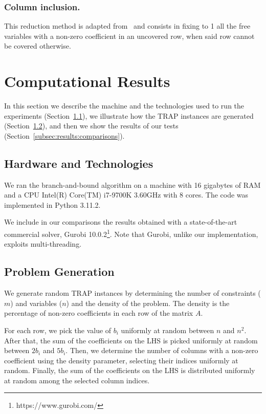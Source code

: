 \documentclass[runningheads]{llncs}
\begin{document}
\subsubsection{Column inclusion.} This reduction method is adapted from~\cite{beasley-1987-algorithm} and consists in fixing to 1 all the free variables with a non-zero coefficient in an uncovered row, when said row cannot be covered otherwise.

\section{Computational Results}
\label{sec:results}

In this section we describe the machine and the technologies used to run the experiments (Section~\ref{subsec:results:tech}), we illustrate how the TRAP instances are generated (Section~\ref{subsec:results:generation}), and then we show the results of our tests (Section~\ref{subsec:results:comparisons}).  

\subsection{Hardware and Technologies}
\label{subsec:results:tech}

We ran the branch-and-bound algorithm on a machine with 16 gigabytes of RAM and a CPU Intel(R) Core(TM) i7-9700K 3.60GHz with 8 cores. The code was implemented in Python 3.11.2.

We include in our comparisons the results obtained with a state-of-the-art commercial solver, Gurobi 10.0.2\footnote{https://www.gurobi.com/}. Note that Gurobi, unlike our implementation, exploits multi-threading. 


\subsection{Problem Generation}
\label{subsec:results:generation}

We generate random TRAP instances by determining the number of constraints ($m$) and variables ($n$) and the density of the problem. The density is the percentage of non-zero coefficients in each row of the matrix $A$.

For each row, we pick the value of $b_i$ uniformly at random between $n$ and $n^2$. After that, the sum of the coefficients on the LHS is picked uniformly at random between $2b_i$ and $5b_i$. Then, we determine the number of columns with a non-zero coefficient using the density parameter, selecting their indices uniformly at random. Finally, the sum of the coefficients on the LHS is distributed uniformly at random among the selected column indices.
\end{document}

